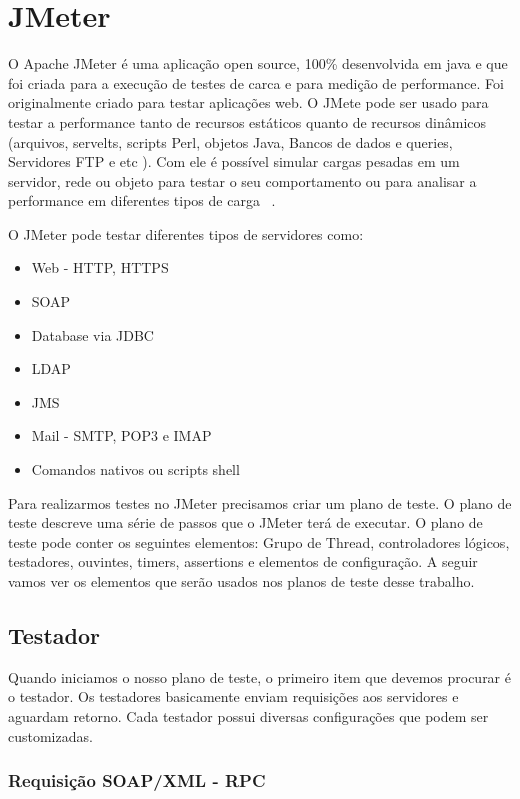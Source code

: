 \section{JMeter}

O Apache JMeter é uma aplicação open source, 100\% desenvolvida em java e que foi criada para a execução de testes de carca e para medição de performance. Foi originalmente criado para testar aplicações web. O JMete pode ser usado para testar a performance tanto de recursos estáticos quanto de recursos dinâmicos  (arquivos, servelts, scripts Perl, objetos Java, Bancos de dados e queries, Servidores FTP e etc ). Com ele é possível simular cargas pesadas em um servidor, rede ou objeto para testar o seu comportamento ou para analisar a performance em diferentes tipos de carga ~\cite{siteJmeter}.

O JMeter pode testar diferentes tipos de servidores como:

\begin{itemize}
\item Web - HTTP, HTTPS
\item SOAP
\item Database via JDBC
\item LDAP
\item JMS
\item Mail - SMTP, POP3 e IMAP
\item Comandos nativos ou scripts shell
\end{itemize}

Para realizarmos testes no JMeter precisamos criar um plano de teste. O plano de teste descreve uma série de passos que o JMeter terá de executar. O plano de teste pode conter os seguintes elementos: Grupo de Thread, controladores lógicos, testadores, ouvintes, timers, assertions e elementos de configuração. A seguir vamos ver os elementos que serão usados nos planos de teste desse trabalho.

\subsection{Testador}

Quando iniciamos o nosso plano de teste, o primeiro item que devemos procurar é o testador. Os testadores basicamente enviam requisições aos servidores e aguardam retorno. Cada testador possui diversas configurações que podem ser customizadas.

\subsubsection{Requisição SOAP/XML - RPC}

